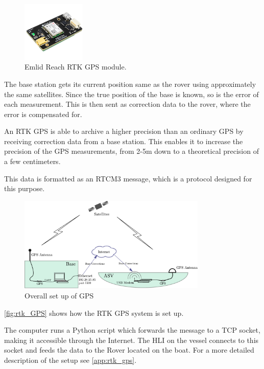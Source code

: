 \begin{figure}[H]
  \includegraphics[width=0.27\textwidth]{figures/emlidReach}
  \caption{Emlid Reach RTK GPS module.\cite{EmlidReachDocs}}
  \label{fig:emlidReach}
\end{figure}

The base station gets its current position same as the rover using approximately the same satellites. Since the true position of the base is known, so is the error of each measurement. This is then sent as correction data to the rover, where the error is compensated for.%

An RTK GPS is able to archive a higher precision than an ordinary GPS by receiving correction data from a base station.
This enables it to increase the precision of the GPS measurements, from 2-5m down to a theoretical precision of a few centimeters.\cite{EmlidRTK}

This data is formatted as an RTCM3 message, which is a protocol designed for this purpose.\\

\begin{figure}[H]
	\includegraphics[width=0.8\textwidth]{figures/comunicationSetup.pdf}
	\caption{Overall set up of GPS}
	\label{fig:rtk_GPS}
\end{figure}
%
\autoref{fig:rtk_GPS} shows how the RTK GPS system is set up. 

The computer runs a Python script which forwards the message to a TCP socket, making it accessible through the Internet. The HLI on the vessel connects to this socket and feeds the data to the Rover located on the boat. For a more detailed description of the setup see \autoref{app:rtk_gps}.
